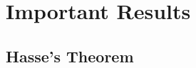 \documentclass[10pt,handout]{beamer} %
\newcommand{\F}{\mathbb F}
\theoremstyle{definition}
\begin{document}
%
%
%

\section{Important Results}
\subsection{Hasse's Theorem}
\end{document}
